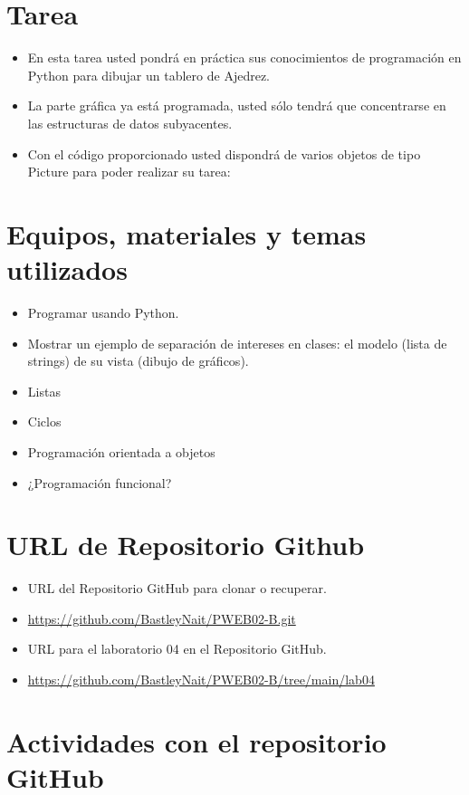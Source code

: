 \documentclass{article}
\begin{document}
	\section{Tarea}
	\begin{itemize}		
		\item En esta tarea usted pondrá en práctica sus conocimientos de programación en Python para dibujar un tablero de Ajedrez.
		\item La parte gráfica ya está programada, usted sólo tendrá que concentrarse en las estructuras de datos subyacentes.
		\item Con el código proporcionado usted dispondrá de varios objetos de tipo Picture para poder realizar su tarea:
	\end{itemize}

	\section{Equipos, materiales y temas utilizados}
	\begin{itemize}
		\item Programar usando Python.
		\item Mostrar un ejemplo de separación de intereses en clases: el modelo (lista de strings) de su vista (dibujo de gráficos).	
		\item Listas
		\item Ciclos
		\item Programación orientada a objetos
		\item ¿Programación funcional?

	\end{itemize}

	\section{URL de Repositorio Github}
	\begin{itemize}
		\item URL del Repositorio GitHub para clonar o recuperar.
		\item \url{https://github.com/BastleyNait/PWEB02-B.git}
		\item URL para el laboratorio 04 en el Repositorio GitHub.
		\item \url{https://github.com/BastleyNait/PWEB02-B/tree/main/lab04}
	\end{itemize}

	\section{Actividades con el repositorio GitHub}
\end{document}
